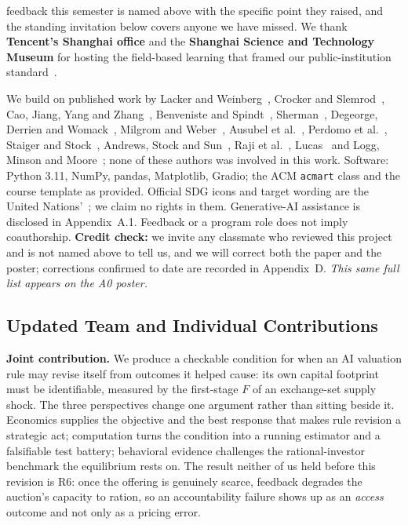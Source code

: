 feedback this semester is named above with the specific point they raised, and the standing invitation below covers anyone we have missed. We thank \textbf{Tencent's Shanghai office} and the \textbf{Shanghai Science and Technology Museum} for hosting the field-based learning that framed our public-institution standard~\cite{dku_cscc_2026}.

We build on published work by Lacker and Weinberg~\cite{lacker1989}, Crocker and Slemrod~\cite{crocker2007}, Cao, Jiang, Yang and Zhang~\cite{cao2023machine}, Benveniste and Spindt~\cite{benveniste1989}, Sherman~\cite{sherman2005}, Degeorge, Derrien and Womack~\cite{degeorge2007}, Milgrom and Weber~\cite{milgrom1982}, Ausubel et al.~\cite{ausubel2014}, Perdomo et al.~\cite{perdomo2020}, Staiger and Stock~\cite{staiger1997}, Andrews, Stock and Sun~\cite{andrews2019}, Raji et al.~\cite{raji2020}, Lucas~\cite{lucas1976} and Logg, Minson and Moore~\cite{logg2019}; none of these authors was involved in this work. Software: Python 3.11, NumPy, pandas, Matplotlib, Gradio; the ACM \texttt{acmart} class and the course template as provided. Official SDG icons and target wording are the United Nations'~\cite{un_sdg,un_sdg_icons}; we claim no rights in them. Generative-AI assistance is disclosed in Appendix~A.1. Feedback or a program role does not imply coauthorship. \textbf{Credit check:} we invite any classmate who reviewed this project and is not named above to tell us, and we will correct both the paper and the poster; corrections confirmed to date are recorded in Appendix~D. \emph{This same full list appears on the A0 poster.}

\subsection*{Updated Team and Individual Contributions}
\textbf{Joint contribution.} We produce a checkable condition for when an AI valuation rule may revise itself from outcomes it helped cause: its own capital footprint must be identifiable, measured by the first-stage $F$ of an exchange-set supply shock. The three perspectives change one argument rather than sitting beside it. Economics supplies the objective and the best response that makes rule revision a strategic act; computation turns the condition into a running estimator and a falsifiable test battery; behavioral evidence challenges the rational-investor benchmark the equilibrium rests on. The result neither of us held before this revision is R6: once the offering is genuinely scarce, feedback degrades the auction's capacity to ration, so an accountability failure shows up as an \emph{access} outcome and not only as a pricing error.

